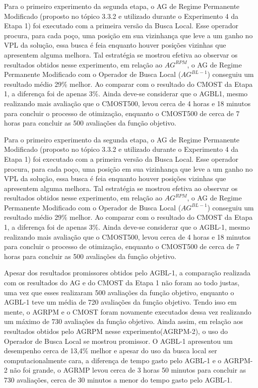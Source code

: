 Para o primeiro experimento da segunda etapa, o AG de Regime Permanente Modificado (proposto no tópico 3.3.2 e utilizado durante o Experimento 4 da Etapa 1) foi executado com a primeira versão da Busca Local. Esse operador procura, para cada poço, uma posição em sua vizinhança que leve a um ganho no VPL da solução, essa busca é feia enquanto houver posições vizinhas que apresentem alguma melhora. Tal estratégia se mostrou efetiva ao observar os resultados obtidos nesse experimento, em relação ao $AG^{RPM}$, o AG de Regime Permanente Modificado com o Operador de Busca Local ($AG^{BL-1}$) conseguiu um resultado médio 29\% melhor. Ao comparar com o resultado do CMOST da Etapa 1, a diferença foi de apenas 3\%. Ainda deve-se considerar que o AGBL1, mesmo realizando mais avaliação que o CMOST500, levou cerca de 4 horas e 18 minutos para concluir o processo de otimização, enquanto o CMOST500 de cerca de 7 horas para concluir as 500 avaliações da função objetivo.

Para o primeiro experimento da segunda etapa, o AG de Regime Permanente Modificado (proposto no tópico 3.3.2 e utilizado durante o Experimento 4 da Etapa 1) foi executado com a primeira versão da Busca Local. Esse operador procura, para cada poço, uma posição em sua vizinhança que leve a um ganho no VPL da solução, essa busca é feia enquanto houver posições vizinhas que apresentem alguma melhora. Tal estratégia se mostrou efetiva ao observar os resultados obtidos nesse experimento, em relação ao $AG^{RPM}$, o AG de Regime Permanente Modificado com o Operador de Busca Local ($AG^{BL-1}$) conseguiu um resultado médio 29\% melhor. Ao comparar com o resultado do CMOST da Etapa 1, a diferença foi de apenas 3\%. Ainda deve-se considerar que o AGBL-1, mesmo realizando mais avaliação que o CMOST500, levou cerca de 4 horas e 18 minutos para concluir o processo de otimização, enquanto o CMOST500 de cerca de 7 horas para concluir as 500 avaliações da função objetivo.

Apesar dos resultados promissores obtidos pelo AGBL-1, a comparação realizada com os resultados do AG e do CMOST da Etapa 1 não foram ao todo justas, uma vez que esses realizaram 500 avaliações da função objetivo, enquanto o AGBL-1 teve um média de 720 avaliações da função objetivo. Tendo isso em mente, o AGRPM e o CMOST foram novamente executados dessa vez realizando um máximo de 730 avaliações da função objetivo. Ainda assim, em relação aos resultados obtidos pelo AGRPM nesse experimento(AGRPM-2), o uso do Operador de Busca Local se mostrou promissor. O AGBL-1 apresentou um desempenho cerca de 13,4\% melhor e apesar do uso da busca local ser computacionalmente cara, a diferença de tempo gasto pelo AGBL-1 e o AGRPM-2 não foi grande, o AGRMP levou cerca de 3 horas 50 minutos para concluir as 730 avaliações, cerca de 30 minutos a menor do tempo gasto pelo AGBL-1.

